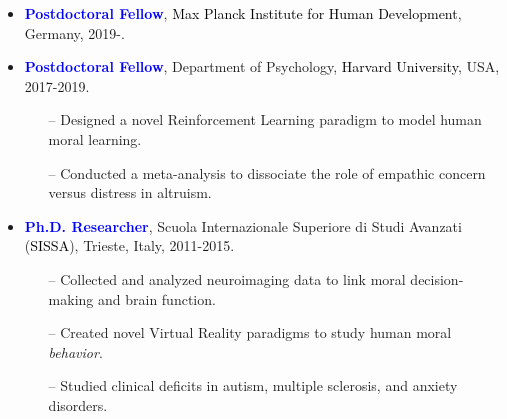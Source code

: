 \documentclass[10pt]{article}
\begin{document}
	\header


	\begin{itemize}

    \itemsep-0.1em
	\item \textbf{\textcolor{blue}{Postdoctoral Fellow}}, \textcolor{black}{Max Planck Institute for Human Development}, Germany, 2019-.
	\miniskip
	
	\item \textbf{\textcolor{blue}{Postdoctoral Fellow}}, Department of Psychology, \textcolor{black}{Harvard University}, USA, 2017-2019.
	\vspace*{-0.09in}
	
	\begin{itemize}
	\itemsep-0.1em 
	\item[--] Designed a novel Reinforcement Learning paradigm to model human moral learning.	
	\item[--] Conducted a meta-analysis to dissociate the role of empathic concern versus distress in altruism.
	\end{itemize}
	\vspace*{-0.09in}

	\item \textbf{\textcolor{blue}{Ph.D. Researcher}}, Scuola Internazionale Superiore di Studi Avanzati (\textcolor{black}{SISSA}), Trieste, Italy, 2011-2015.
	\vspace*{-0.09in}

	\begin{itemize}
	\itemsep-0.1em 
	\item[--] Collected	and analyzed neuroimaging data to link moral decision-making and brain function.
	\item[--] Created novel Virtual Reality paradigms to study human moral \textit{behavior}.
	\item[--] Studied clinical deficits in autism, multiple sclerosis, and anxiety disorders.
	\end{itemize}
    \vspace*{-0.09in}
    
	\end{itemize}    
    
	
\end{document}

